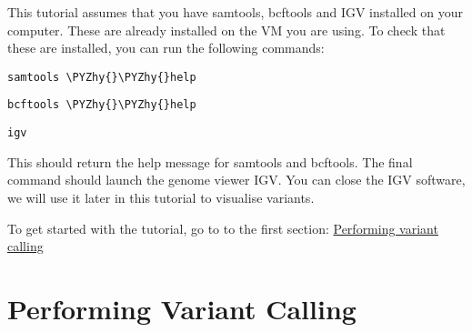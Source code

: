 \documentclass[11pt]{article}
\makeatletter
\def\PYZhy{\char`\-}
\newcommand{\boxspacing}{\kern\kvtcb@left@rule\kern\kvtcb@boxsep}
\newcommand{\prompt}[4]{
        {\ttfamily\llap{{\color{#2}[#3]:\hspace{3pt}#4}}\vspace{-\baselineskip}}
    }
\makeatother
\begin{document}
This tutorial assumes that you have samtools, bcftools and IGV installed
on your computer. These are already installed on the VM you are using.
To check that these are installed, you can run the following commands:

    \begin{tcolorbox}[breakable, size=fbox, boxrule=1pt, pad at break*=1mm,colback=cellbackground, colframe=cellborder]
\prompt{In}{incolor}{ }{\boxspacing}
\begin{Verbatim}[commandchars=\\\{\}]
samtools \PYZhy{}\PYZhy{}help
\end{Verbatim}
\end{tcolorbox}

    \begin{tcolorbox}[breakable, size=fbox, boxrule=1pt, pad at break*=1mm,colback=cellbackground, colframe=cellborder]
\prompt{In}{incolor}{ }{\boxspacing}
\begin{Verbatim}[commandchars=\\\{\}]
bcftools \PYZhy{}\PYZhy{}help
\end{Verbatim}
\end{tcolorbox}

    \begin{tcolorbox}[breakable, size=fbox, boxrule=1pt, pad at break*=1mm,colback=cellbackground, colframe=cellborder]
\prompt{In}{incolor}{ }{\boxspacing}
\begin{Verbatim}[commandchars=\\\{\}]
igv
\end{Verbatim}
\end{tcolorbox}

    This should return the help message for samtools and bcftools. The final
command should launch the genome viewer IGV. You can close the IGV
software, we will use it later in this tutorial to visualise variants.

To get started with the tutorial, go to to the first section:
\href{variant-calling.ipynb}{Performing variant calling}





\newpage





    \hypertarget{performing-variant-calling}{%
\section{Performing Variant Calling}\label{performing-variant-calling}}
\end{document}
